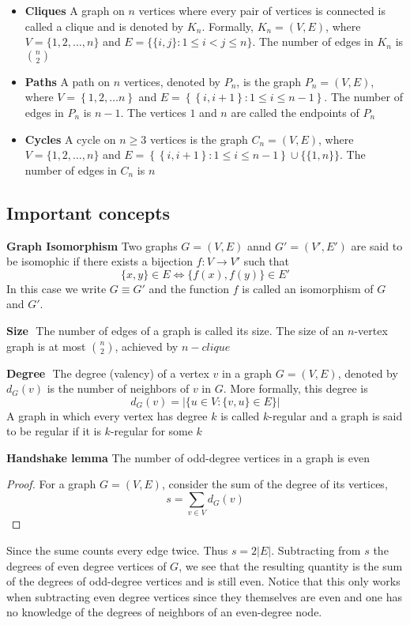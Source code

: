 \documentclass[11pt]{article}
\begin{document}
\begin{itemize}
  \item \textbf{Cliques} A graph on $n$ vertices where every pair of vertices is connected is called a clique and is denoted by $K_n$. Formally, $K_n = (V,E)$, where $V = \{ 1,2,\dots , n\}$ and $E = \{ \{ i, j\}: 1\leq i < j \leq n \}$. The number of edges in $K_n$ is $\binom{n}{2}$
  \item \textbf{Paths} A path on $n$ vertices, denoted by $P_n$, is the graph $P_n = (V, E)$, where $V= \left\{ 1,2, \dots n \right\}$ and $E = \left\{ \left\{ i, i+1 \right\} : 1 \leq i \leq n-1 \right\}$. The number of edges in $P_n$ is $n-1$. The vertices $1$ and $n$ are called the endpoints of $P_n$
  \item \textbf{Cycles} A cycle on $n\geq 3$ vertices is the graph $C_n = (V, E)$, where $V = \{ 1,2, \dots , n\}$ and $E = \left\{ \left\{ i, i+1 \right\} : 1 \leq i \leq n-1 \right\} \cup \{ \{ 1, n\}\}$. The number of edges in $C_n$ is $n$
\end{itemize}


\subsection*{Important concepts}

\begin{theorem*}
  \textbf{Graph Isomorphism} Two graphs $G=(V,E)$ annd $G' = (V', E')$ are said to be isomophic if there exists a bijection $f: V\to V'$ such that
  \[
    \{ x,y \} \in E \iff \{ f(x), f(y)\} \in E'
  \]
  In this case we write $G \equiv G'$ and the function $f$ is called an isomorphism of $G$ and $G'$.
\end{theorem*}

$ $\\
\textbf{Size} $  $ The number of edges of a graph is called its size. The size of an $n$-vertex graph is at most $\binom{n}{2}$, achieved by $n-clique$

$ $\\
\textbf{Degree} $  $ The degree (valency) of a vertex $v$ in a graph $G = (V,E)$, denoted by $d_G (v)$ is the number of neighbors of $v$ in $G$. More formally, this degree is
\[
  d_G(v) = | \{ u\in V: \{ v, u\}\in E\} |
\]
A graph in which every vertex has degree $k$ is called $k$-regular and a graph is said to be regular if it is $k$-regular for some $k$

\begin{proposition*}
  \textbf{Handshake lemma}
  The number of odd-degree vertices in a graph is even
  \begin{proof}
    For a graph $G = (V,E)$, consider the sum of the degree of its vertices,
    \[
      s = \sum_{v\in V} d_G (v)
    \]
  \end{proof}
  Since the sume counts every edge twice. Thus $s = 2|E|$. Subtracting from $s$ the degrees of even degree vertices of $G$, we see that the resulting quantity is the sum of the degrees of odd-degree vertices and is still even. Notice that this only works when subtracting even degree vertices since they themselves are even and one has no knowledge of the degrees of neighbors of an even-degree node.
\end{proposition*}
\end{document}
